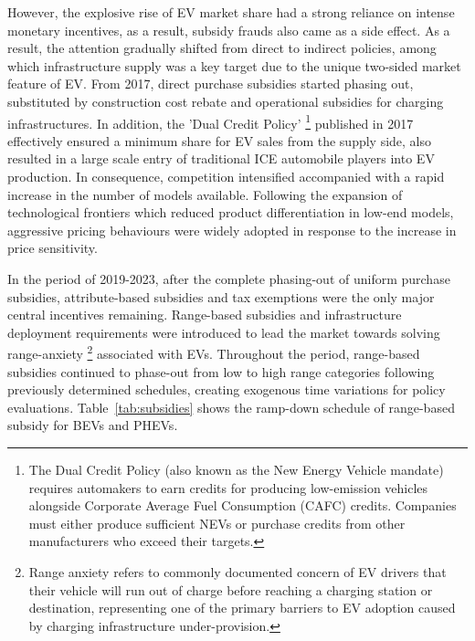 \documentclass[12pt]{article}
\begin{document}
However, the explosive rise of EV market share had a strong reliance on intense monetary incentives, as a result, subsidy frauds also came as a side effect. 
As a result, the attention gradually shifted from direct to indirect policies, among which infrastructure supply was a key target due to the unique two-sided market feature of EV. 
From 2017, direct purchase subsidies started phasing out, substituted by construction cost rebate and operational subsidies for charging infrastructures. 
In addition, the 'Dual Credit Policy' \footnote{The Dual Credit Policy (also known as the New Energy Vehicle mandate) requires automakers to earn credits for producing low-emission vehicles alongside Corporate Average Fuel Consumption (CAFC) credits. 
Companies must either produce sufficient NEVs or purchase credits from other manufacturers who exceed their targets.} published in 2017 effectively ensured a minimum share for EV sales from the supply side, 
also resulted in a large scale entry of traditional ICE automobile players into EV production. 
In consequence, competition intensified accompanied with a rapid increase in the number of models available.
Following the expansion of technological frontiers which reduced product differentiation in low-end models, aggressive pricing behaviours were widely adopted in response to the increase in price sensitivity.

In the period of 2019-2023, after the complete phasing-out of uniform purchase subsidies, attribute-based subsidies and tax exemptions were the only major central incentives remaining. 
Range-based subsidies and infrastructure deployment requirements were introduced to lead the market towards solving range-anxiety
\footnote{Range anxiety refers to commonly documented concern of EV drivers that their vehicle will run out of charge before reaching a charging station or destination, 
representing one of the primary barriers to EV adoption caused by charging infrastructure under-provision.} associated with EVs. 
Throughout the period, range-based subsidies continued to phase-out from low to high range categories following previously determined schedules, creating exogenous time variations for policy evaluations. 
Table~\ref{tab:subsidies} shows the ramp-down schedule of range-based subsidy for BEVs and PHEVs.
\end{document}
